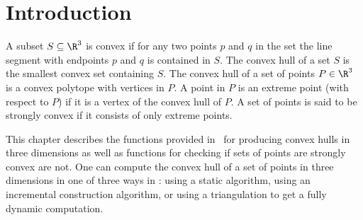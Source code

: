 \section{Introduction}

A subset $S \subseteq \R^3$ is convex if for any two points $p$ and $q$
in the set the line segment with endpoints $p$ and $q$ is contained
in $S$. The convex hull of a set $S$ 
is the smallest convex set containing
$S$. The convex hull of a set of points $P \in \R^3$ is a convex 
polytope with vertices in $P$. A point in $P$ is an extreme point 
(with respect to $P$) if it is a vertex of 
the convex hull of $P$.  A set of points is said to be strongly convex %
 if it consists of only extreme points.

This chapter describes the functions provided in
\cgal\ for producing convex hulls in three dimensions as well as
functions for checking if sets of points are strongly convex are not.  
One can compute the convex hull of a set of points in three dimensions
in one of three ways in \cgal: using a static algorithm,
using an incremental construction algorithm, or using a
triangulation to get a fully dynamic computation.

